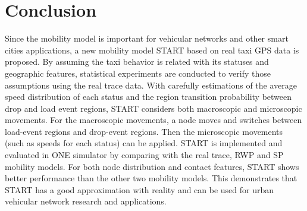 \documentclass[10pt,journal,compsocconf,letterpaper]{IEEEtran}
\begin{document}






%



\section{Conclusion}
\label{section_conclusion}
Since the mobility model is important for vehicular networks and other smart cities applications, a new mobility model START based on real taxi GPS data is proposed. By assuming the taxi behavior is related with its statuses and geographic features, statistical experiments are conducted to verify those assumptions using the real trace data. With carefully estimations of the average speed distribution of each status and the region transition probability between drop and load event regions, START considers both macroscopic and microscopic movements. For the macroscopic movements, a node moves and switches between load-event regions and drop-event regions. Then the microscopic movements (such as speeds for each status) can be applied. START is implemented and evaluated in ONE simulator by comparing with the real trace, RWP and SP mobility models.
For both node distribution and contact features, START shows better performance than the other two mobility models. This demonstrates that START has a good approximation with reality and can be used for urban vehicular network research and applications.




%
%
\end{document}
